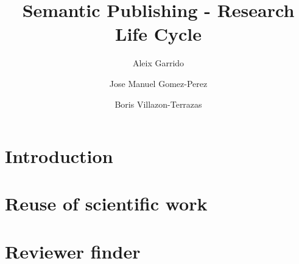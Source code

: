 \documentclass{llncs}
\begin{document}
%
\frontmatter          %
%
\pagestyle{headings}  %
%
%
\mainmatter              %
%
\title{Semantic Publishing - Research Life Cycle}

%
%
\author{Aleix Garrido \and Jose Manuel Gomez-Perez \and Boris Villazon-Terrazas}
%
%
%





\begin{abstract}


\end{abstract}

\section{Introduction}\label{sec:Introduction}


\section{Reuse of scientific work}\label{sec:RelatedWork}


\section{Reviewer finder}\label{sec:Motivation}

\end{document}
